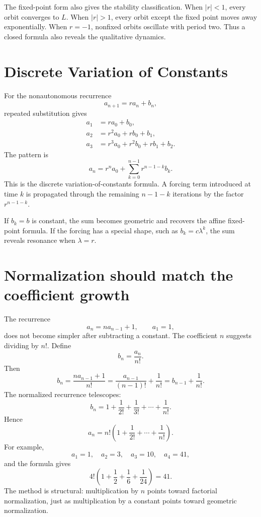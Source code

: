 The fixed-point form also gives the stability classification.  When \(|r|<1\), every orbit converges to \(L\).  When \(|r|>1\), every orbit except the fixed point moves away exponentially.  When \(r=-1\), nonfixed orbits oscillate with period two.  Thus a closed formula also reveals the qualitative dynamics.

\section{Discrete Variation of Constants}

For the nonautonomous recurrence
\[
  a_{n+1}=ra_n+b_n,
\]
repeated substitution gives
\[
\begin{aligned}
a_1&=ra_0+b_0,\\
a_2&=r^2a_0+rb_0+b_1,\\
a_3&=r^3a_0+r^2b_0+rb_1+b_2.
\end{aligned}
\]
The pattern is
\[
  \boxed{
  a_n=r^n a_0+
  \sum_{k=0}^{n-1}r^{n-1-k}b_k.}
\]
This is the discrete variation-of-constants formula.  A forcing term introduced at time \(k\) is propagated through the remaining \(n-1-k\) iterations by the factor \(r^{n-1-k}\).

If \(b_k=b\) is constant, the sum becomes geometric and recovers the affine fixed-point formula.  If the forcing has a special shape, such as \(b_k=c\lambda^k\), the sum reveals resonance when \(\lambda=r\).

\section{Normalization should match the coefficient growth}

The recurrence
\[
  a_n=na_{n-1}+1,
  \qquad
  a_1=1,
\]
does not become simpler after subtracting a constant.  The coefficient \(n\) suggests dividing by \(n!\).  Define
\[
  b_n=\frac{a_n}{n!}.
\]
Then
\[
  b_n
  =\frac{na_{n-1}+1}{n!}
  =\frac{a_{n-1}}{(n-1)!}+\frac1{n!}
  =b_{n-1}+\frac1{n!}.
\]
The normalized recurrence telescopes:
\[
  b_n
  =1+\frac1{2!}+\frac1{3!}+\cdots+\frac1{n!}.
\]
Hence
\[
  \boxed{
  a_n=n!\left(
  1+\frac1{2!}+\cdots+\frac1{n!}
  \right).}
\]
For example,
\[
  a_1=1,
  \quad
  a_2=3,
  \quad
  a_3=10,
  \quad
  a_4=41,
\]
and the formula gives
\[
  4!\left(1+\frac12+\frac16+\frac1{24}\right)=41.
\]
The method is structural: multiplication by \(n\) points toward factorial normalization, just as multiplication by a constant points toward geometric normalization.

